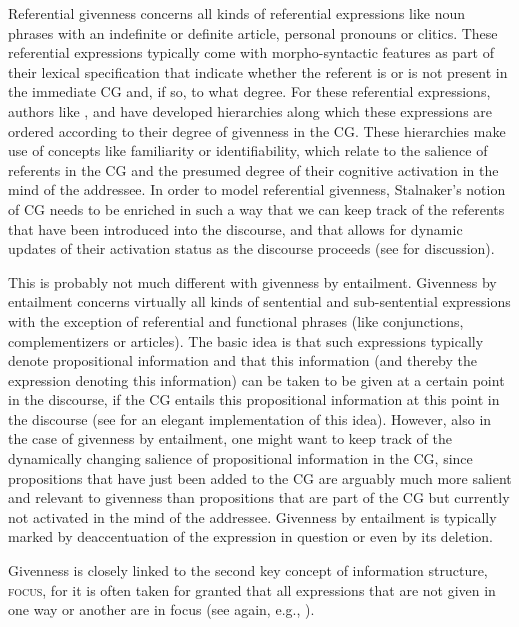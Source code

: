 \documentclass[output=paper,colorlinks,citecolor=brown]{langscibook}
\begin{document}
Referential givenness concerns all kinds of referential expressions like noun phrases with an indefinite or definite article, personal pronouns or clitics. These referential expressions typically come with morpho-syntactic features as part of their lexical specification that indicate whether the referent is or is not present in the immediate CG and, if so, to what degree. For these referential expressions, authors like \citet{prince1981},  \citet{ariel1990} and \citet{gundel.etal1993} have developed hierarchies along which these expressions are ordered according to their degree of givenness in the CG. These hierarchies make use of concepts like familiarity or identifiability, which relate to the salience of referents in the CG and the presumed degree of their cognitive activation in the mind of the addressee. In order to model referential givenness, Stalnaker's notion of CG needs to be enriched in such a way that we can keep track of the referents that have been introduced into the discourse, and that allows for dynamic updates of their activation status as the discourse proceeds (see \citet{krifka2007} for discussion).      

This is probably not much different with givenness by entailment. Givenness by entailment concerns virtually all kinds of sentential and sub-sentential expressions with the exception of referential and functional phrases (like conjunctions, complementizers or articles). The basic idea is that such expressions typically denote propositional information and that this information (and thereby the expression denoting this information) can be taken to be given at a certain point in the discourse, if the CG entails this propositional information at this point in the discourse (see \citet{schwarzschild1999} for an elegant implementation of this idea). However, also in the case of givenness by entailment, one might want to keep track of the dynamically changing salience of propositional information in the CG, since propositions that have just been added to the CG are arguably much more salient and relevant to givenness than propositions that are part of the CG but currently not activated in the mind of the addressee. Givenness by entailment is typically marked by deaccentuation of the expression in question or even by its deletion. 

Givenness is closely linked to the second key concept of information structure, \textsc{focus}, for it is often taken for granted that all expressions that are not given in one way or another are in focus (see again, e.g., \citealt{schwarzschild1999}).
\end{document}
